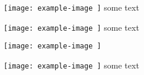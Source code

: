 \texttt{[image: example-image
]}
some text

\texttt{[image: example-image
]}
some text

\texttt{[image: example-image
]}
%

\texttt{[image: example-image
]}
some text
